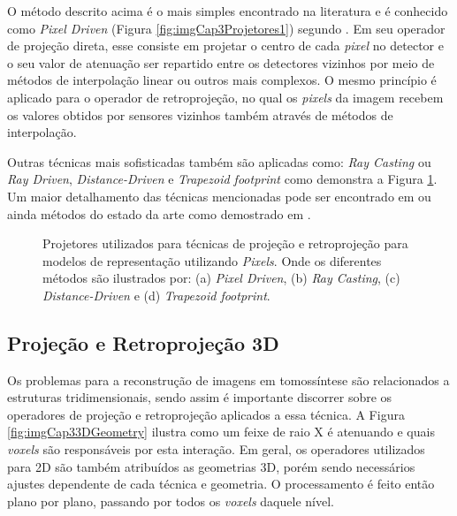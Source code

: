 O método descrito acima é o mais simples encontrado na literatura e é conhecido como \textit{Pixel Driven} (Figura \ref{fig:imgCap3Projetores1}) segundo . Em seu operador de projeção direta, esse consiste em projetar o centro de cada \textit{pixel} no detector e o seu valor de atenuação ser repartido entre os detectores vizinhos por meio de métodos de interpolação linear ou outros mais complexos. O mesmo princípio é aplicado para o operador de retroprojeção, no qual os \textit{pixels} da imagem recebem os valores obtidos por sensores vizinhos também através de métodos de interpolação.

Outras técnicas mais sofisticadas também são aplicadas como: \textit{Ray Casting} ou \textit{Ray Driven}, \textit{Distance-Driven} e \textit{Trapezoid footprint} como demonstra a Figura \ref{fig:imgCap3Projetores}. Um maior detalhamento das técnicas mencionadas pode ser encontrado em  ou ainda métodos do estado da arte como demostrado em .

\begin{figure}[H]
	\centering
	
	\caption{Projetores utilizados para técnicas de projeção e retroprojeção para modelos de representação utilizando \textit{Pixels}. Onde os diferentes métodos são ilustrados por: (a) \textit{Pixel Driven}, (b) \textit{Ray Casting}, (c) \textit{Distance-Driven} e (d) \textit{Trapezoid footprint}.}
	
	\hfil
	\hfil
	\hfil
	\hfil
	
	\label{fig:imgCap3Projetores}
\end{figure}  
  
\subsection{Projeção e Retroprojeção 3D}\label{ProjeçãoeRetroprojeção3D}

Os problemas para a reconstrução de imagens em tomossíntese são relacionados a estruturas tridimensionais, sendo assim é importante discorrer sobre os operadores de projeção e retroprojeção aplicados a essa técnica. A Figura \ref{fig:imgCap33DGeometry} ilustra como um feixe de raio X é atenuando e quais \textit{voxels} são responsáveis por esta interação. Em geral, os operadores utilizados para \acs{2D} são também atribuídos as geometrias \acs{3D}, porém sendo necessários ajustes dependente de cada técnica e geometria. O processamento é feito então plano por plano, passando por todos os \textit{voxels} daquele nível. 


